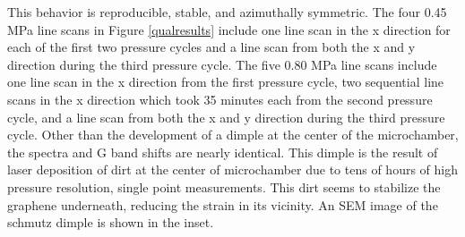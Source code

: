 This behavior is reproducible, stable, and azimuthally symmetric.  The four 0.45 MPa line scans in Figure \ref{qualresults} include one line scan in the x direction for each of the first two pressure cycles and a line scan from both the x and y direction during the third pressure cycle.  The five 0.80 MPa line scans include one line scan in the x direction from the first pressure cycle, two sequential line scans in the x direction which took 35 minutes each from the second pressure cycle, and a line scan from both the x and y direction during the third pressure cycle.  Other than the development of a dimple at the center of the microchamber, the spectra and G band shifts are nearly identical.  This dimple is the result of laser deposition of dirt at the center of microchamber due to tens of hours of high pressure resolution, single point measurements.  This dirt seems to stabilize the graphene underneath, reducing the strain in its vicinity.  An SEM image of the schmutz dimple is shown in the inset.

